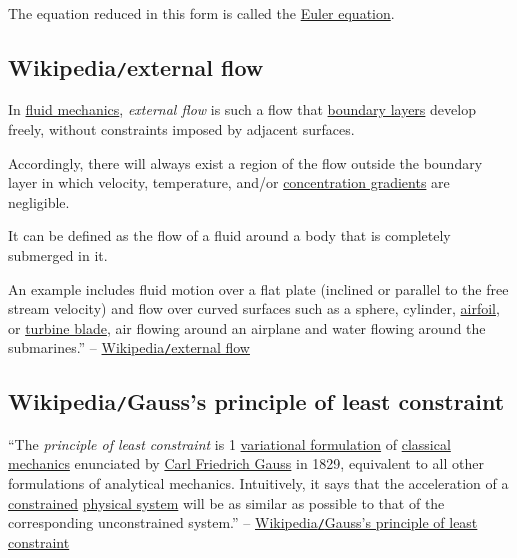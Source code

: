 \documentclass{article}
\begin{document}
The equation reduced in this form is called the \href{https://en.wikipedia.org/wiki/Euler_equations_(fluid_dynamics)}{Euler equation}.


\subsection{Wikipedia{\tt/}external flow}
In \href{https://en.wikipedia.org/wiki/Fluid_mechanics}{fluid mechanics}, \textit{external flow} is such a flow that \href{https://en.wikipedia.org/wiki/Boundary_layer}{boundary layers} develop freely, without constraints imposed by adjacent surfaces.

Accordingly, there will always exist a region of the flow outside the boundary layer in which velocity, temperature, and/or \href{https://en.wikipedia.org/wiki/Concentration_gradient}{concentration gradients} are negligible.

It can be defined as the flow of a fluid around a body that is completely submerged in it.

%
An example includes fluid motion over a flat plate (inclined or parallel to the free stream velocity) and flow over curved surfaces such as a sphere, cylinder, \href{https://en.wikipedia.org/wiki/Airfoil}{airfoil}, or \href{https://en.wikipedia.org/wiki/Turbine_blade}{turbine blade}, air flowing around an airplane and water flowing around the submarines.'' -- \href{https://en.wikipedia.org/wiki/External_flow}{Wikipedia{\tt/}external flow}


\subsection{Wikipedia{\tt/}Gauss's principle of least constraint}
``The \textit{principle of least constraint} is 1 \href{https://en.wikipedia.org/wiki/Variational_principle}{variational formulation} of \href{https://en.wikipedia.org/wiki/Classical_mechanics}{classical mechanics} enunciated by \href{https://en.wikipedia.org/wiki/Carl_Friedrich_Gauss}{Carl Friedrich Gauss} in 1829, equivalent to all other formulations of analytical mechanics. Intuitively, it says that the acceleration of a \href{https://en.wikipedia.org/wiki/Constraint_(classical_mechanics)}{constrained} \href{https://en.wikipedia.org/wiki/Physical_system}{physical system} will be as similar as possible to that of the corresponding unconstrained system.'' -- \href{https://en.wikipedia.org/wiki/Gauss%27s_principle_of_least_constraint}{Wikipedia{\tt/}Gauss's principle of least constraint}
\end{document}
